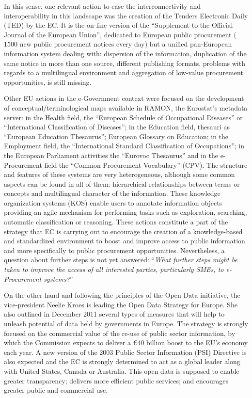 In this sense, one relevant action to ease the interconnectivity and interoperability in this landscape was the creation of the Tenders Electronic Daily (TED) 
by the EC. It is the on-line version of the ``Supplement to the Official Journal of the European Union'', dedicated to European public procurement 
($1500$ new public procurement notices every day) but a unified pan-European information system dealing with: dispersion of the information,
duplication of the same notice in more than one source, different publishing formats, problems with regards to a multilingual environment and 
aggregation of low-value procurement opportunities, is still missing. 


Other EU actions in the e-Government context were focused on the development of conceptual/terminological maps available in RAMON, the Eurostat's metadata server: 
in the Health field, the ``European Schedule of Occupational Diseases'' or ``International Classification of Diseases''; in the Education field,  
thesauri as ``European Education Thesaurus''; European Glossary on Education; in the Employment field, 
the ``International Standard Classification of Occupations'';  in the European Parliament activities the ``Eurovoc Thesaurus'' and in the 
e-Procurement field the ``Common Procurement Vocabulary'' (CPV). The structure and features of these systems are very heterogeneous, 
although some common aspects can be found in all of them: hierarchical relationships between terms or concepts and multilingual character of the information. 
These knowledge organization systems (KOS) enable users to annotate information objects providing an agile mechanism for performing 
tasks such as exploration, searching, automatic classification or reasoning. These actions constitute a part of the strategy that EC 
is carrying out to encourage the creation of a knowledge-based and standardized environment to boost and improve access to 
public information and more specifically to public procurement opportunities. Nevertheless, a question about further steps is not yet answered: ``\textit{What further steps might be 
taken to improve the access of all interested parties, particularly SMEs, to e-Procurement systems?}''

On the other hand and following the principles of the Open Data initiative, the vice-president Neelie Kroes is leading the Open Data Strategy for Europe. 
She also outlined in December 2011 several types of measures that will help to unleash potential of data held by governments in Europe. The strategy is 
strongly focused on the commercial value of the re-use of public sector information, by which the Commission expects to deliver a \euro 40 billion boost to the EU's economy each year. 
A new version of the 2003 Public Sector Information (PSI) Directive is also expected and the EC is strongly determined to act as a global leader along with United States, 
Canada or Australia. This open data is supposed to enable greater transparency; delivers more efficient public services; and encourages greater public and commercial use.


